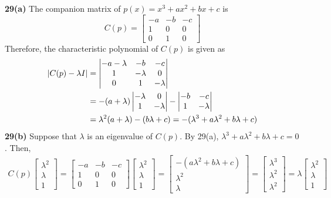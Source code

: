 \textbf{29(a)} The companion matrix of $p(x) = x^3 + ax^2 + bx + c$ is \begin{equation*}
	C(p) = \begin{bmatrix}
		-a & -b & -c \\ 1 & 0 & 0 \\ 0 & 1 & 0
	\end{bmatrix}
\end{equation*} Therefore, the characteristic polynomial of $C(p)$ is given as \begin{align*}
	\vert C(p) - \lambda I \vert &= \begin{vmatrix}
		-a-\lambda & -b & -c \\ 1 & -\lambda & 0 \\ 0 & 1 & -\lambda
	\end{vmatrix} \\
	&= -(a+\lambda)\begin{vmatrix}
		-\lambda & 0 \\ 1 & -\lambda
	\end{vmatrix} - \begin{vmatrix}
		-b & -c \\ 1 & -\lambda
	\end{vmatrix} \\
	&= \-\lambda^2(a+\lambda)-(b\lambda + c) = -(\lambda^3 + a\lambda^2 + b\lambda + c)
\end{align*}
\textbf{29(b)} Suppose that $\lambda$ is an eigenvalue of $C(p)$. By 29(a), $\lambda^3 + a\lambda^2 + b\lambda + c = 0$. Then, \begin{align*}
	C(p)\begin{bmatrix}
		\lambda^2 \\ \lambda \\ 1
	\end{bmatrix} = \begin{bmatrix}
		-a & -b & -c \\ 1 & 0 & 0 \\ 0 & 1 & 0
	\end{bmatrix}\begin{bmatrix}
		\lambda^2 \\ \lambda \\ 1
	\end{bmatrix} = \begin{bmatrix}
		-(a\lambda^2 + b\lambda + c) \\ \lambda^2 \\ \lambda
	\end{bmatrix} = \begin{bmatrix}
		\lambda^3 \\ \lambda^2 \\ \lambda^2
	\end{bmatrix} = \lambda \begin{bmatrix}
		\lambda^2 \\ \lambda \\ 1
	\end{bmatrix}
\end{align*}
